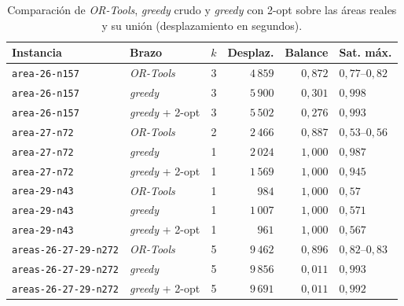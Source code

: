\begin{enumerate}
\begin{table}[H]
  \centering
  \caption{
    Comparación de \textit{OR-Tools}, \textit{greedy} crudo y \textit{greedy} con 2-opt sobre las
    áreas reales y su unión (desplazamiento en segundos).
  }
  \label{tab:areas-brazos}
  \begin{tabularx}{\textwidth}{>{\raggedright\arraybackslash}p{3.2cm}Xrrrl}
    \toprule
    Instancia &
      Brazo &
      $k$ &
      Desplaz. &
      Balance &
      Sat. máx. \\
    \midrule
    \texttt{area-26-n157} &
      \textit{OR-Tools}      &
      3 &
      $4\,859$ &
      $0{,}872$ &
      $0{,}77$--$0{,}82$ \\
    \texttt{area-26-n157} &
      \textit{greedy}        &
      3 &
      $5\,900$ &
      $0{,}301$ &
      $0{,}998$ \\
    \texttt{area-26-n157} &
      \textit{greedy} + 2-opt& 3 &
      $5\,502$ &
      $0{,}276$ &
      $0{,}993$ \\
    \midrule
    \texttt{area-27-n72}  &
      \textit{OR-Tools}      &
      2 &
      $2\,466$ &
      $0{,}887$ &
      $0{,}53$--$0{,}56$ \\
    \texttt{area-27-n72}  &
      \textit{greedy}        &
      1 &
      $2\,024$ &
      $1{,}000$ &
      $0{,}987$ \\
    \texttt{area-27-n72}  &
      \textit{greedy} + 2-opt& 1 &
      $1\,569$ &
      $1{,}000$ &
      $0{,}945$ \\
    \midrule
    \texttt{area-29-n43}  &
      \textit{OR-Tools}      &
      1 &
      $984$ &
      $1{,}000$ &
      $0{,}57$ \\
    \texttt{area-29-n43}  &
      \textit{greedy}        &
      1 &
      $1\,007$ &
      $1{,}000$ &
      $0{,}571$ \\
    \texttt{area-29-n43}  &
      \textit{greedy} + 2-opt& 1 &
      $961$ &
      $1{,}000$ &
      $0{,}567$ \\
    \midrule
    \texttt{areas-26-27-29-n272} &
      \textit{OR-Tools}       &
      5 &
      $9\,462$ &
      $0{,}896$ &
      $0{,}82$--$0{,}83$ \\
    \texttt{areas-26-27-29-n272} &
      \textit{greedy}         &
      5 &
      $9\,856$ &
      $0{,}011$ &
      $0{,}993$ \\
    \texttt{areas-26-27-29-n272} &
      \textit{greedy} + 2-opt &
      5 &
      $9\,691$ &
      $0{,}011$ &
      $0{,}992$ \\
    \bottomrule
  \end{tabularx}
\end{table}


\end{enumerate}
